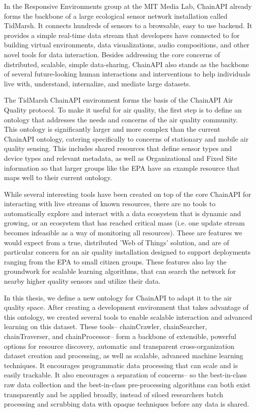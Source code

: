 In the Responsive Environments group at the MIT Media Lab, ChainAPI already forms the backbone of a large ecological sensor network installation called TidMarsh. \cite{tidmarsh}  It connects hundreds of sensors to a browsable, easy to use backend.  It provides a simple real-time data stream that developers have connected to for building virtual environments, data visualizations, audio compositions, and other novel tools for data interaction.  Besides addressing the core concerns of distributed, scalable, simple data-sharing, ChainAPI also stands as the backbone of several future-looking human interactions and interventions to help individuals live with, understand, internalize, and mediate large datasets.

The TidMarsh ChainAPI environment forms the basis of the ChainAPI Air Quality protocol.  To make it useful for air quality, the first step is to define an ontology that addresses the needs and concerns of the air quality community.  This ontology is significantly larger and more complex than the current ChainAPI ontology, catering specifically to concerns of stationary and mobile air quality sensing.  This includes shared resources that define sensor types and device types and relevant metadata, as well as Organizational and Fixed Site information so that larger groups like the EPA have an example resource that maps well to their current ontology.

While several interesting tools have been created on top of the core ChainAPI for interacting with live streams of known resources, there are no tools to automatically explore and interact with a data ecosystem that is dynamic and growing, or an ecosystem that has reached critical mass (i.e. one update stream becomes infeasible as a way of monitoring all resources).  These are features we would expect from a true, distributed 'Web of Things' solution, and are of particular concern for an air quality installation designed to support deployments ranging from the EPA to small citizen groups.  These features also lay the groundwork for scalable learning algorithms, that can search the network for nearby higher quality sensors and utilize their data.

In this thesis, we define a new ontology for ChainAPI to adapt it to the air quality space.  After creating a development environment that takes advantage of this ontology, we created several tools to enable scalable interaction and advanced learning on this dataset.  These tools-- chainCrawler, chainSearcher, chainTraverser, and chainProcessor-- form a backbone of extensible, powerful options for resource discovery, automatic and transparent cross-organization dataset creation and processing, as well as scalable, advanced machine learning techniques.  It encourages programmatic data processing that can scale and is easily trackable.  It also encourages a separation of concerns-- so the best-in-class raw data collection and the best-in-class pre-processing algorithms can both exist transparently and be applied broadly, instead of siloed researchers batch processing and scrubbing data with opaque techniques before any data is shared.

